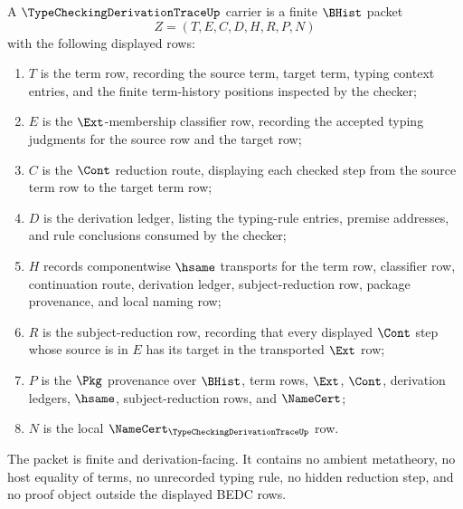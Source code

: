 \begin{definition}
\label{def:type-checking-derivation-trace-carrier}
A $\TypeCheckingDerivationTraceUp$ carrier is a finite $\BHist$ packet
$$
Z=(T,E,C,D,H,R,P,N)
$$
with the following displayed rows:
\begin{enumerate}
\item $T$ is the term row, recording the source term, target term, typing context entries, and the finite term-history positions inspected by the checker;
\item $E$ is the $\Ext$-membership classifier row, recording the accepted typing judgments for the source row and the target row;
\item $C$ is the $\Cont$ reduction route, displaying each checked step from the source term row to the target term row;
\item $D$ is the derivation ledger, listing the typing-rule entries, premise addresses, and rule conclusions consumed by the checker;
\item $H$ records componentwise $\hsame$ transports for the term row, classifier row, continuation route, derivation ledger, subject-reduction row, package provenance, and local naming row;
\item $R$ is the subject-reduction row, recording that every displayed $\Cont$ step whose source is in $E$ has its target in the transported $\Ext$ row;
\item $P$ is the $\Pkg$ provenance over $\BHist$, term rows, $\Ext$, $\Cont$, derivation ledgers, $\hsame$, subject-reduction rows, and $\NameCert$;
\item $N$ is the local $\NameCert_{\TypeCheckingDerivationTraceUp}$ row.
\end{enumerate}
The packet is finite and derivation-facing. It contains no ambient metatheory, no host equality of terms, no unrecorded typing rule, no hidden reduction step, and no proof object outside the displayed BEDC rows.
\end{definition}

